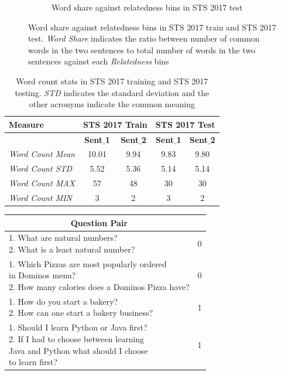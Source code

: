 \begin{enumerate}
\begin{figure}
\begin{subfigure}[b]{.5\textwidth}
		\caption{Word share against relatedness bins in STS 2017 test}
		\label{fig:sts_test_word_share}
	\end{subfigure}
	\caption[Word share against relatedness bins in STS 2017 train and STS 2017 test.]{Word share against relatedness bins in STS 2017 train and STS 2017 test. \textit{Word Share} indicates the ratio between number of common words in the two sentences to total number of words in the two sentences against each \textit{Relatedness} bins}
	\label{fig:sts_word_share}
\end{figure}


\begin{table}
	\centering
	\begin{tabular}{l|cc|cc}
		\hline
		Measure   & \multicolumn{2}{c|}{STS 2017 Train} & \multicolumn{2}{c}{STS 2017 Test} \\
		\hline
		\multicolumn{1}{l|}{} & \textbf{Sent$\_$1} & \textbf{Sent$\_$2} & \textbf{Sent$\_$1} & \textbf{Sent$\_$2} \\
		\textit{Word Count Mean} & 10.01 & 9.94 & 9.83 & 9.80  \\
		\textit{Word Count STD} & 5.52 & 5.36 & 5.14 & 5.14  \\
		\textit{Word Count MAX} & 57 & 48 & 30 & 30  \\
		\textit{Word Count MIN} & 3 & 2 & 3 & 2  \\
		\hline
	\end{tabular}
	\caption[Word count stats in STS 2017]{Word count stats in STS 2017 training and STS 2017 testing. \textit{STD} indicates the standard deviation and the other acronyms indicate the common meaning }
	\label{table:sts_2017_sts}
\end{table}

 \begin{table}[ht!]
	\centering 	
	\begin{tabular}{l|c} 
		\hline
		\multicolumn{1}{c|}{\textbf{Question Pair}} & 
		\multicolumn{1}{c}{\textbf{\detokenize{is-duplicate}}}  \\
		\hline
		\makecell[l]
		{	1. What are natural numbers? \\ 
			2. What is a least natural number?} & 0  \\
		\hline
		\makecell[l]
		{	1. Which Pizzas are most popularly ordered \\ in Dominos menu? \\ 
			2. How many calories does a Dominos Pizza have?} & 0  \\
		\hline
		\makecell[l]
		{   1. How do you start a bakery? \\ 
			2. How can one start a bakery business?} & 1  \\
		\hline
		\makecell[l]
		{	1. Should I learn Python or Java first? \\ 
			2. If I had to choose between learning \\ Java and Python what should I choose \\ to learn first?} & 1  \\
		\hline
		

\end{tabular}
\end{table}
\end{enumerate}
